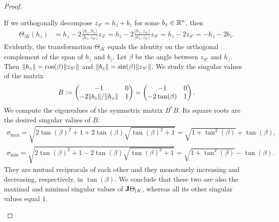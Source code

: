 \documentclass[10pt,a4paper]{article}
\begin{document}
\begin{proof}
\begin{itemize}
        If we orthogonally decompose $z_{S'} = h_{z} + b_{z}$ for some $b_{z} \in {\mathbb R}^{n}$, then 
        \begin{align*}
            \Theta_{|K}( h_{z} ) 
            &= 
            h_{z}
            - 
            2 \frac{\langle h_{z}, h_{z} \rangle}{\langle h_{z}, z_{S'} \rangle} z_{S'}
            = 
            h_{z}
            - 
            2 \frac{\langle h_{z}, z_{S'} \rangle}{\langle h_{z}, z_{S'} \rangle} z_{S'}
            = 
            h_{z}
            - 
            2 z_{S'}
            = 
            - h_{z}
            - 
            2 b_{z}
            .
        \end{align*}
        Evidently, the transformation $\Theta_{|K}$ equals the identity on the orthogonal complement of the span of $h_{z}$ and $b_{z}$. 
        Let $\beta$ be the angle between $z_{S'}$ and $h_{z}$. 
        Then $\|  h_{z}  \| = \cos(\beta) \|  z_{S'}  \|$ and $\|  b_{z}  \| = \sin(\beta) \|  z_{S'}  \|$. 
        We study the singular values of the matrix 
        \begin{align*}
            B 
            := 
            \begin{pmatrix}
            -1                 & 0
            \\ 
            -2 \|  b_{z}  \|/\|  h_{z}  \| & 1
            \end{pmatrix}
            =
            \begin{pmatrix}
            -1             & 0
            \\ 
            -2 \tan(\beta) & 1
            \end{pmatrix}
            .
        \end{align*}
        We compute the eigenvalues of the symmetric matrix $B^{\ast} B$. 
        Its square roots are the desired singular values of $B$:
        \begin{align}
            \sigma_{\max} = \sqrt{ 2\tan(\beta)^2 + 1 + 2 \tan(\beta) \sqrt{ \tan(\beta)^2 + 1 } } = \sqrt{ 1 + \tan^{2}(\beta) } + \tan(\beta) \label{math:theta_max}
            ,
            \\
            \sigma_{\min} = \sqrt{ 2\tan(\beta)^2 + 1 - 2 \tan(\beta) \sqrt{ \tan(\beta)^2 + 1 } } = \sqrt{ 1 + \tan^{2}(\beta) } - \tan(\beta) \label{math:theta_min}
            .
        \end{align}
        They are mutual reciprocals of each other and they monotonely increasing and decreasing, respectively, in $\tan(\beta)$.
        We conclude that these two are also the maximal and minimal singular values of ${\mathbf{J}}\Theta_{|K}$,
        whereas all its other singular values equal $1$. 
        

\end{itemize}
\end{proof}
\end{document}
